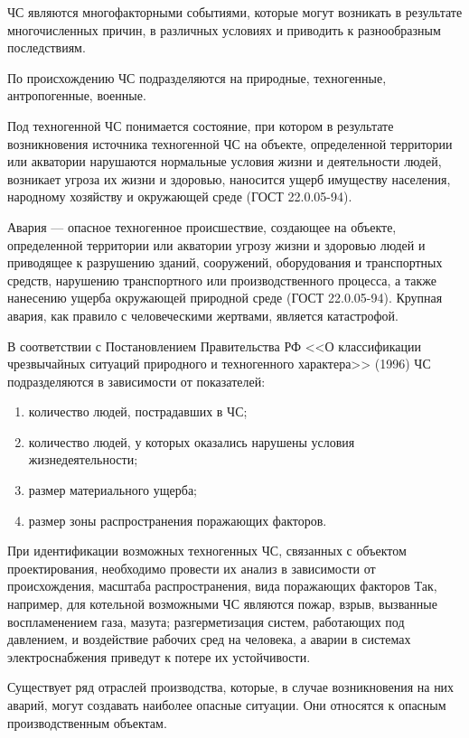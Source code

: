 ЧС являются многофакторными событиями, которые могут возникать в результате многочисленных причин, в различных условиях и приводить к разнообразным последствиям.

По происхождению ЧС подразделяются на природные, техногенные, антропогенные, военные.

Под техногенной ЧС понимается состояние, при котором в результате возникновения источника техногенной ЧС на объекте, определенной территории или акватории нарушаются нормальные условия жизни и деятельности людей, возникает угроза их жизни и здоровью, наносится ущерб имуществу населения, народному хозяйству и окружающей среде (ГОСТ 22.0.05-94).

Авария --- опасное техногенное происшествие, создающее на объекте, определенной территории или акватории угрозу жизни и здоровью людей и приводящее к разрушению зданий, сооружений, оборудования и транспортных средств, нарушению транспортного или производственного процесса, а также нанесению ущерба окружающей природной среде (ГОСТ 22.0.05-94). Крупная авария, как правило с человеческими жертвами, является катастрофой.

В соответствии с Постановлением Правительства РФ <<О классификации чрезвычайных ситуаций природного и техногенного характера>> (1996) ЧС подразделяются в зависимости от показателей:

\begin{enumerate}
	\item количество людей, пострадавших в ЧС;
	\item количество людей, у которых оказались нарушены условия жизнедеятельности;
	\item размер материального ущерба;
	\item размер зоны распространения поражающих факторов.
\end{enumerate}

При идентификации возможных техногенных ЧС, связанных с объектом проектирования, необходимо провести их анализ в зависимости от происхождения, масштаба распространения, вида поражающих факторов Так, например, для котельной возможными ЧС являются пожар, взрыв, вызванные воспламенением газа, мазута; разгерметизация систем, работающих под давлением, и воздействие рабочих сред на человека, а аварии в системах электроснабжения приведут к потере их устойчивости.

Существует ряд отраслей производства, которые, в случае возникновения на них аварий, могут создавать наиболее опасные ситуации. Они относятся к опасным производственным объектам. 

